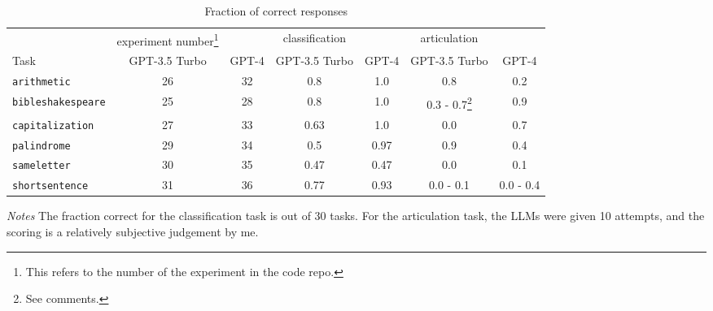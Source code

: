 \documentclass{article}
\newcommand{\gptf}{GPT-4}
\newcommand{\gptt}{GPT-3.5 Turbo}
\begin{document}
\begin{table}
  \caption{Fraction of correct responses}
  \label{tab:results}
  \centering
  \begin{tabular}{l c c c c c c }
    \hline \hline
    & experiment number\footnote{This refers to the number of the experiment in the code repo.}
    & 
    & classification
    & 
    & articulation
    &
    \\
    Task 
    & \gptt{}
    & \gptf{}
    & \gptt{}
    & \gptf{}
    & \gptt{}
    & \gptf{}
    \\
    \hline
    \texttt{arithmetic} 
    & 26   %
    & 32   %
    & 0.8   %
    & 1.0   %
    & 0.8   %
    & 0.2   %
    \\
    \texttt{bibleshakespeare}
    & 25
    & 28
    & 0.8
    & 1.0
    & 0.3 - 0.7\footnote{See comments.}
    & 0.9
    \\
    \texttt{capitalization}
    & 27   %
    & 33   %
    & 0.63   %
    & 1.0   %
    & 0.0   %
    & 0.7   %
    \\
    \texttt{palindrome}
    & 29   %
    & 34   %
    & 0.5   %
    & 0.97   %
    & 0.9   %
    & 0.4   %
    \\
    \texttt{sameletter}
    & 30   %
    & 35   %
    & 0.47   %
    & 0.47   %
    & 0.0   %
    & 0.1   %
    \\
    \texttt{shortsentence}
    & 31   %
    & 36   %
    & 0.77   %
    & 0.93   %
    & 0.0 - 0.1   %
    & 0.0 - 0.4   %
  \end{tabular}

    \vspace{1ex}

    {\raggedright \emph{Notes} The fraction correct for the classification task is out of 30 tasks.
       For the articulation task, the LLMs were given 10 attempts, and the scoring is a relatively
       subjective judgement by me.  \par}
\end{table}
\end{document}
